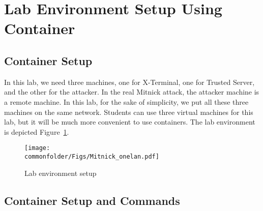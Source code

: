 \section{Lab Environment Setup Using Container}



\subsection{Container Setup}

In this lab, we need three machines, 
one for X-Terminal, one for Trusted Server, and the other for the attacker. 
In the real Mitnick attack, the attacker machine is a remote machine. 
In this lab, for the 
sake of simplicity, we put all these three machines on the same network. 
Students can use three virtual
machines for this lab, but it will be much more convenient to
use containers. The lab environment is depicted 
Figure~\ref{mitnick:fig:labsetup}.



\begin{figure}[htb]
\begin{center}
\texttt{[image: \\commonfolder/Figs/Mitnick\_onelan.pdf]}
\end{center}
\caption{Lab environment setup}
\label{mitnick:fig:labsetup}
\end{figure}
 

%



\subsection{Container Setup and Commands}

